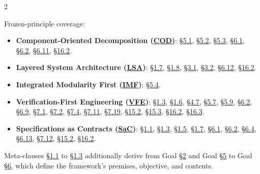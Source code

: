 \endgroup

\begin{multicols}{2}

Frozen-principle coverage:

\begin{itemize}\setlength{\itemsep}{0pt}\setlength{\parskip}{0pt}

\item \textbf{Component-Oriented Decomposition (\hyperlink{gp-COD}{COD})}: \hyperlink{nss-5.1}{\S5.1}, \hyperlink{nss-5.2}{\S5.2}, \hyperlink{nss-5.3}{\S5.3}, \hyperlink{nss-6.1}{\S6.1}, \hyperlink{nss-6.2}{\S6.2}, \hyperlink{nss-6.11}{\S6.11}, \hyperlink{nss-16.2}{\S16.2}.

\item \textbf{Layered System Architecture (\hyperlink{gp-LSA}{LSA})}: \hyperlink{nss-1.7}{\S1.7}, \hyperlink{nss-1.8}{\S1.8}, \hyperlink{nss-3.1}{\S3.1}, \hyperlink{nss-3.2}{\S3.2}, \hyperlink{nss-6.12}{\S6.12}, \hyperlink{nss-16.2}{\S16.2}.

\item \textbf{Integrated Modularity First (\hyperlink{gp-IMF}{IMF})}: \hyperlink{nss-5.4}{\S5.4}.

\item \textbf{Verification-First Engineering (\hyperlink{gp-VFE}{VFE})}: \hyperlink{nss-1.3}{\S1.3}, \hyperlink{nss-1.6}{\S1.6}, \hyperlink{nss-4.7}{\S4.7}, \hyperlink{nss-5.7}{\S5.7}, \hyperlink{nss-5.9}{\S5.9}, \hyperlink{nss-6.2}{\S6.2}, \hyperlink{nss-6.9}{\S6.9}, \hyperlink{nss-7.1}{\S7.1}, \hyperlink{nss-7.2}{\S7.2}, \hyperlink{nss-7.4}{\S7.4}, \hyperlink{nss-7.11}{\S7.11}, \hyperlink{nss-7.19}{\S7.19}, \hyperlink{nss-15.2}{\S15.2}, \hyperlink{nss-15.3}{\S15.3}, \hyperlink{nss-16.2}{\S16.2}, \hyperlink{nss-16.3}{\S16.3}.

\item \textbf{Specifications as Contracts (\hyperlink{gp-SaC}{SaC})}: \hyperlink{nss-1.1}{\S1.1}, \hyperlink{nss-1.3}{\S1.3}, \hyperlink{nss-1.5}{\S1.5}, \hyperlink{nss-1.7}{\S1.7}, \hyperlink{nss-6.1}{\S6.1}, \hyperlink{nss-6.2}{\S6.2}, \hyperlink{nss-6.4}{\S6.4}, \hyperlink{nss-6.13}{\S6.13}, \hyperlink{nss-7.12}{\S7.12}, \hyperlink{nss-15.2}{\S15.2}, \hyperlink{nss-16.2}{\S16.2}.

\end{itemize}

Meta-clauses \hyperlink{nss-1.1}{\S1.1} to \hyperlink{nss-1.3}{\S1.3} additionally derive from Goal \hyperlink{nss-2}{\S2} and Goal \hyperlink{nss-5}{\S5} to Goal \hyperlink{nss-6}{\S6}, which define the framework's premises, objective, and contents.

\end{multicols}
